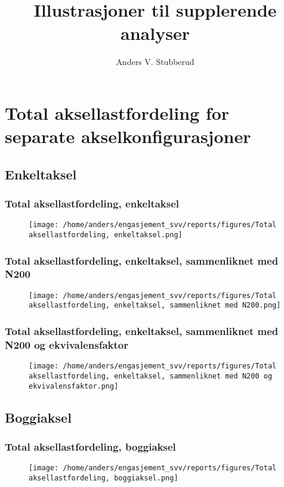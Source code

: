 \documentclass{article}
\begin{document}
\title{Illustrasjoner til supplerende analyser}
\author{Anders V. Stubberud}
\maketitle
\tableofcontents
\newpage
\section{Total aksellastfordeling for separate akselkonfigurasjoner}
\subsection{Enkeltaksel}
\subsubsection{Total aksellastfordeling, enkeltaksel}
\begin{figure}[H]
\centering
\texttt{[image: /home/anders/engasjement\_svv/reports/figures/Total aksellastfordeling, enkeltaksel.png]}
\end{figure}
\subsubsection{Total aksellastfordeling, enkeltaksel, sammenliknet med N200}
\begin{figure}[H]
\centering
\texttt{[image: /home/anders/engasjement\_svv/reports/figures/Total aksellastfordeling, enkeltaksel, sammenliknet med N200.png]}
\end{figure}
\subsubsection{Total aksellastfordeling, enkeltaksel, sammenliknet med N200 og ekvivalensfaktor}
\begin{figure}[H]
\centering
\texttt{[image: /home/anders/engasjement\_svv/reports/figures/Total aksellastfordeling, enkeltaksel, sammenliknet med N200 og ekvivalensfaktor.png]}
\end{figure}
\subsection{Boggiaksel}
\subsubsection{Total aksellastfordeling, boggiaksel}
\begin{figure}[H]
\centering
\texttt{[image: /home/anders/engasjement\_svv/reports/figures/Total aksellastfordeling, boggiaksel.png]}
\end{figure}
\end{document}
